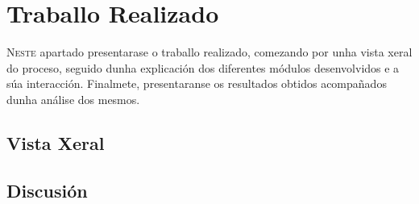 \chapter{Traballo Realizado}
\label{chap:Traballo Realizado}

\lettrine{N}{este} apartado presentarase o traballo realizado, comezando por unha vista xeral do proceso, 
seguido dunha explicación dos diferentes módulos desenvolvidos e a súa interacción.
Finalmete, presentaranse os resultados obtidos acompañados dunha análise dos mesmos.
\section{Vista Xeral}
\label{sec:VistaXeral}


\section{Discusión}
\label{sec:Discusión}